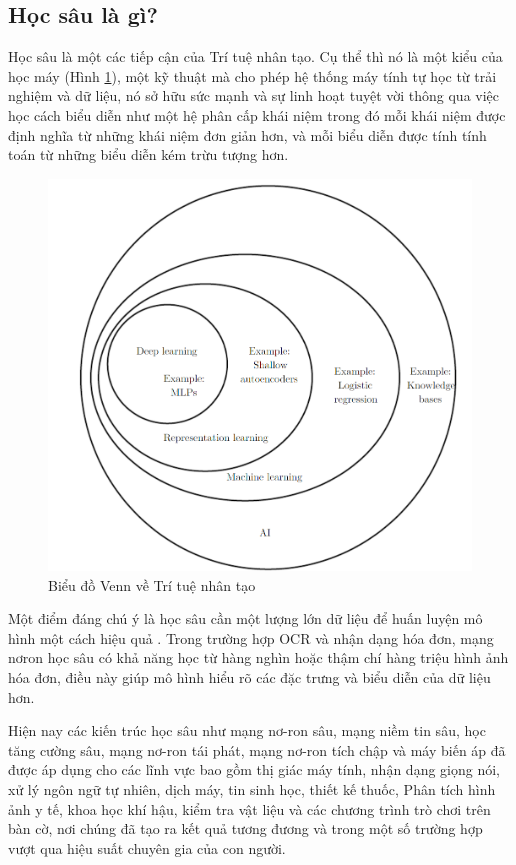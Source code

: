 \subsection{Học sâu là gì?}
Học sâu là một các tiếp cận của Trí tuệ nhân tạo. Cụ thể thì nó là một kiểu của học máy (Hình \ref{fig:venn1}), một kỹ thuật mà cho phép hệ thống máy tính tự học từ trải nghiệm và dữ liệu, nó sở hữu sức mạnh và sự linh hoạt tuyệt vời thông qua việc học cách biểu diễn như một hệ phân cấp khái niệm trong đó mỗi khái niệm được định nghĩa từ những khái niệm đơn giản hơn, và mỗi biểu diễn được tính tính toán từ những biểu diễn kém trừu tượng hơn. \cite{Goodfellow-et-al-2016}

\begin{figure}
    \includegraphics[scale=0.45]{images/venn_diagram_deeplearning.png}
    \centering
    \caption{Biểu đồ Venn về Trí tuệ nhân tạo}
    \label{fig:venn1}
\end{figure}


Một điểm đáng chú ý là học sâu cần một lượng lớn dữ liệu để huấn luyện mô hình một cách hiệu quả \cite{wiki-deep-learning}. Trong trường hợp OCR và nhận dạng hóa đơn, mạng nơron học sâu có khả năng học từ hàng nghìn hoặc thậm chí hàng triệu hình ảnh hóa đơn, điều này giúp mô hình hiểu rõ các đặc trưng và biểu diễn của dữ liệu hơn.

Hiện nay các kiến trúc học sâu như mạng nơ-ron sâu, mạng niềm tin sâu, học tăng cường sâu, mạng nơ-ron tái phát, mạng nơ-ron tích chập và máy biến áp đã được áp dụng cho các lĩnh vực bao gồm thị giác máy tính, nhận dạng giọng nói, xử lý ngôn ngữ tự nhiên, dịch máy, tin sinh học, thiết kế thuốc, Phân tích hình ảnh y tế, khoa học khí hậu, kiểm tra vật liệu và các chương trình trò chơi trên bàn cờ, nơi chúng đã tạo ra kết quả tương đương và trong một số trường hợp vượt qua hiệu suất chuyên gia của con người.

